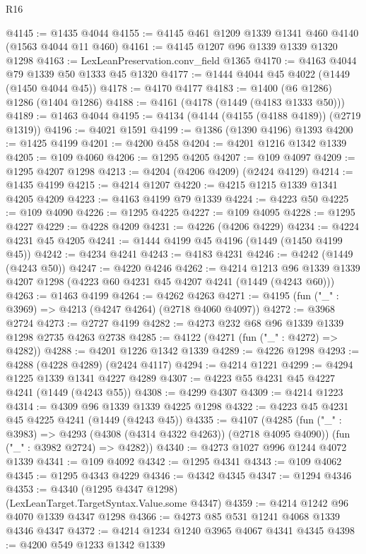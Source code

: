 \begin{lexlean}{R16}
\begin{coremodule}
@4145 := @1435 @4044
@4155 := @4145 @461 @1209 @1339 @1341 @460 @4140 (@1563 @4044 @11 @460)
@4161 := @4145 @1207 @96 @1339 @1339 @1320 @1298
@4163 := LexLeanPreservation.conv_field @1365
@4170 := @4163 @4044 @79 @1339 @50 @1333 @45 @1320
@4177 := @1444 @4044 @45 @4022 (@1449 (@1450 @4044 @45))
@4178 := @4170 @4177
@4183 := @1400 (@6 @1286) @1286 (@1404 @1286)
@4188 := @4161 (@4178 (@1449 (@4183 @1333 @50)))
@4189 := @1463 @4044
@4195 := @4134 (@4144 (@4155 (@4188 @4189)) (@2719 @1319))
@4196 := @4021 @1591
@4199 := @1386 (@1390 @4196) @1393
@4200 := @1425 @4199
@4201 := @4200 @458
@4204 := @4201 @1216 @1342 @1339
@4205 := @109 @4060
@4206 := @1295 @4205
@4207 := @109 @4097
@4209 := @1295 @4207 @1298
@4213 := @4204 (@4206 @4209) (@2424 @4129)
@4214 := @1435 @4199
@4215 := @4214 @1207
@4220 := @4215 @1215 @1339 @1341 @4205 @4209
@4223 := @4163 @4199 @79 @1339
@4224 := @4223 @50
@4225 := @109 @4090
@4226 := @1295 @4225
@4227 := @109 @4095
@4228 := @1295 @4227
@4229 := @4228 @4209
@4231 := @4226 (@4206 @4229)
@4234 := @4224 @4231 @45 @4205
@4241 := @1444 @4199 @45 @4196 (@1449 (@1450 @4199 @45))
@4242 := @4234 @4241
@4243 := @4183 @4231
@4246 := @4242 (@1449 (@4243 @50))
@4247 := @4220 @4246
@4262 := @4214
    @1213
    @96
    @1339
    @1339
    @4207
    @1298
    (@4223 @60 @4231 @45 @4207 @4241 (@1449 (@4243 @60)))
@4263 := @1463 @4199
@4264 := @4262 @4263
@4271 := @4195 (fun ("_" : @3969) => @4213 (@4247 @4264) (@2718 @4060 @4097))
@4272 := @3968 @2724
@4273 := @2727 @4199
@4282 := @4273 @232 @68 @96 @1339 @1339 @1298 @2735 @4263 @2738
@4285 := @4122 (@4271 (fun ("_" : @4272) => @4282))
@4288 := @4201 @1226 @1342 @1339
@4289 := @4226 @1298
@4293 := @4288 (@4228 @4289) (@2424 @4117)
@4294 := @4214 @1221
@4299 := @4294 @1225 @1339 @1341 @4227 @4289
@4307 := @4223 @55 @4231 @45 @4227 @4241 (@1449 (@4243 @55))
@4308 := @4299 @4307
@4309 := @4214 @1223
@4314 := @4309 @96 @1339 @1339 @4225 @1298
@4322 := @4223 @45 @4231 @45 @4225 @4241 (@1449 (@4243 @45))
@4335 := @4107
    (@4285
      (fun ("_" : @3983) => @4293 (@4308 (@4314 @4322 @4263)) (@2718 @4095 @4090))
      (fun ("_" : @3982 @2724) => @4282))
@4340 := @4273 @1027 @996 @1244 @4072 @1339
@4341 := @109 @4092
@4342 := @1295 @4341
@4343 := @109 @4062
@4345 := @1295 @4343 @4229
@4346 := @4342 @4345
@4347 := @1294 @4346
@4353 := @4340 (@1295 @4347 @1298) (LexLeanTarget.TargetSyntax.Value.some @4347)
@4359 := @4214 @1242 @96 @4070 @1339 @4347 @1298
@4366 := @4273 @85 @531 @1241 @4068 @1339 @4346 @4347
@4372 := @4214 @1234 @1240 @3965 @4067 @4341 @4345
@4398 := @4200
    @549
    @1233
    @1342
    @1339

\end{coremodule}
\end{lexlean}
